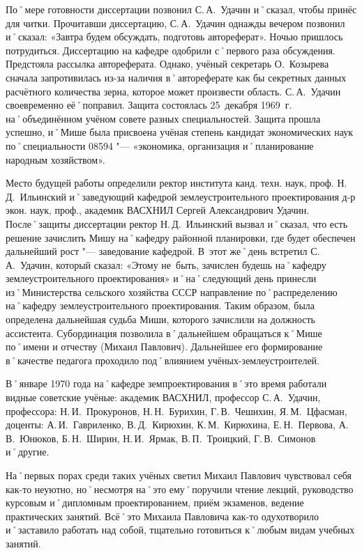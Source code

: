 По˚мере готовности диссертации позвонил С.\,А.~Удачин и˚сказал, чтобы принёс для читки. Прочитавши диссертацию, С.\,А.~Удачин однажды вечером позвонил и˚сказал: «Завтра будем обсуждать, подготовь автореферат». Ночью пришлось потрудиться. Диссертацию на кафедре одобрили с˚первого раза обсуждения. Предстояла рассылка автореферата. Однако, учёный секретарь О.~Козырева сначала запротивилась из-за наличия в˚автореферате как бы секретных данных расчётного количества зерна, которое может произвести область. С.\,А.~Удачин своевременно её˚поправил. Защита состоялась 25~декабря 1969~г. на˚объединённом учёном совете разных специальностей. Защита прошла успешно, и˚Мише была присвоена учёная степень кандидат экономических наук по˚специальности 08594 "--- «экономика, организация и˚планирование народным хозяйством». 

Место будущей работы определили ректор института канд. техн. наук, проф. Н.\,Д.~Ильинский и˚заведующий кафедрой землеустроительного проектирования д-р экон. наук, проф., академик ВАСХНИЛ Сергей Александрович Удачин. После˚защиты диссертации ректор Н.\,Д.~Ильинский вызвал и˚сказал, что есть решение зачислить Мишу на˚кафедру районной планировки, где будет обеспечен дальнейший рост "--- заведование кафедрой. В~этот же˚день встретил С.\,А.~Удачин, который сказал: «Этому не~быть, зачислен будешь на˚кафедру землеустроительного проектирования» и˚на˚следующий день принесли из˚Министерства сельского хозяйства СССР направление по˚распределению на˚кафедру землеустроительного проектирования. Таким образом, была определена дальнейшая судьба Миши, которого зачислили на должность ассистента. Субординация позволила в˚дальнейшем обращаться к˚Мише по˚имени и отчеству (Михаил Павлович). Дальнейшее его формирование в˚качестве педагога проходило под˚влиянием учёных-землеустроителей.

В˚январе 1970 года на˚кафедре земпроектирования в˚это время работали видные советские учёные: академик ВАСХНИЛ, профессор С.\,А.~Удачин, профессора: Н.\,И.~Прокуронов, Н.\,Н.~Бурихин, Г.\,В.~Чешихин, Я.\,М.~Цфасман, доценты: А.\,И.~Гавриленко, В.\,Д.~Кирюхин, К.\,М.~Кирюхина, Е.\,Н.~Первова, А.\,В.~Юнюков, Б.\,Н.~Ширин, Н.\,И.~Ярмак, В.\,П.~Троицкий, Г.\,В.~Симонов и˚другие. 

На˚первых порах среди таких учёных светил Михаил Павлович чувствовал себя как-то неуютно, но˚несмотря на˚это ему˚поручили чтение лекций, руководство курсовым и˚дипломным проектированием, приём экзаменов, ведение практических занятий. Всё˚это Михаила Павловича как-то одухотворило и˚заставило работать над собой, тщательно готовиться к˚любым видам учебных занятий.

